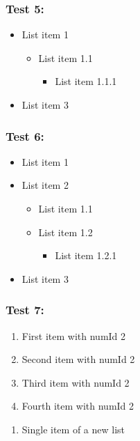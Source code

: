 \documentclass[11pt,a4paper]{article}
\begin{document}
\subsubsection{Test 5:}

\begin{itemize}
\item List item 1
  \begin{itemize}
\item List item 1.1
    \begin{itemize}
\item List item 1.1.1
    \end{itemize}
  \end{itemize}
\item List item 3
\end{itemize}

\subsubsection{Test 6:}

\begin{itemize}
\item List item 1
\item List item 2
  \begin{itemize}
\item List item 1.1
\item List item 1.2
    \begin{itemize}
\item List item 1.2.1
    \end{itemize}
  \end{itemize}
\item List item 3
\end{itemize}

\subsubsection{Test 7:}

\begin{enumerate}
\item First item with numId 2
\item Second item with numId 2
\item Third item with numId 2
\item Fourth item with numId 2
\end{enumerate}

\begin{enumerate}
\item Single item of a new list
\end{enumerate}
\end{document}

